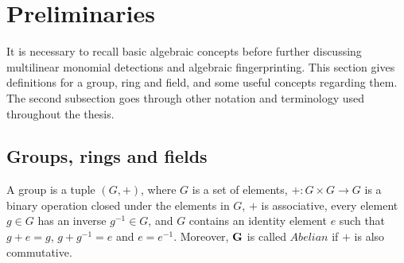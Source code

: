 

\section{Preliminaries}

It is necessary to recall basic algebraic concepts 
before further discussing multilinear monomial detections and algebraic fingerprinting. 
This section gives definitions for a group, ring and field, and some useful concepts 
regarding them. The second subsection goes through other notation and terminology used 
throughout the thesis.

\subsection{Groups, rings and fields} %

A group 
is a tuple $(G, +)$, where $G$ is a set of elements,
$+ \colon G \times G \to G$
is a binary operation closed under 
the elements in $G$, $+$ is associative, every element $g\in G$ has an inverse $g^{-1}\in G$, and $G$ contains 
an identity element $e$ such that $g + e = g$, $g + g^{-1} = e$ and $e = e^{-1}$. Moreover, $\textbf G$ is called $Abelian$ if 
$+$ is also commutative.


